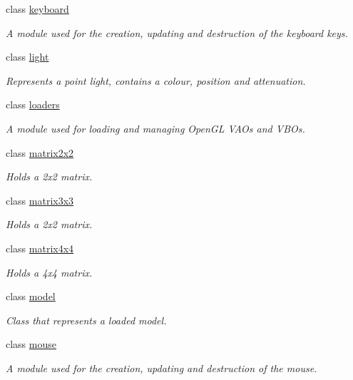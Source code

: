 \begin{DoxyCompactItemize}
class \hyperlink{classflounder_1_1keyboard}{keyboard}
\begin{DoxyCompactList}\small\item\em A module used for the creation, updating and destruction of the keyboard keys. \end{DoxyCompactList}\item 
class \hyperlink{classflounder_1_1light}{light}
\begin{DoxyCompactList}\small\item\em Represents a point light, contains a colour, position and attenuation. \end{DoxyCompactList}\item 
class \hyperlink{classflounder_1_1loaders}{loaders}
\begin{DoxyCompactList}\small\item\em A module used for loading and managing Open\+GL V\+AO\textquotesingle{}s and V\+BO\textquotesingle{}s. \end{DoxyCompactList}\item 
class \hyperlink{classflounder_1_1matrix2x2}{matrix2x2}
\begin{DoxyCompactList}\small\item\em Holds a 2x2 matrix. \end{DoxyCompactList}\item 
class \hyperlink{classflounder_1_1matrix3x3}{matrix3x3}
\begin{DoxyCompactList}\small\item\em Holds a 2x2 matrix. \end{DoxyCompactList}\item 
class \hyperlink{classflounder_1_1matrix4x4}{matrix4x4}
\begin{DoxyCompactList}\small\item\em Holds a 4x4 matrix. \end{DoxyCompactList}\item 
class \hyperlink{classflounder_1_1model}{model}
\begin{DoxyCompactList}\small\item\em Class that represents a loaded model. \end{DoxyCompactList}\item 
class \hyperlink{classflounder_1_1mouse}{mouse}
\begin{DoxyCompactList}\small\item\em A module used for the creation, updating and destruction of the mouse. \end{DoxyCompactList}\item 

\end{DoxyCompactItemize}
